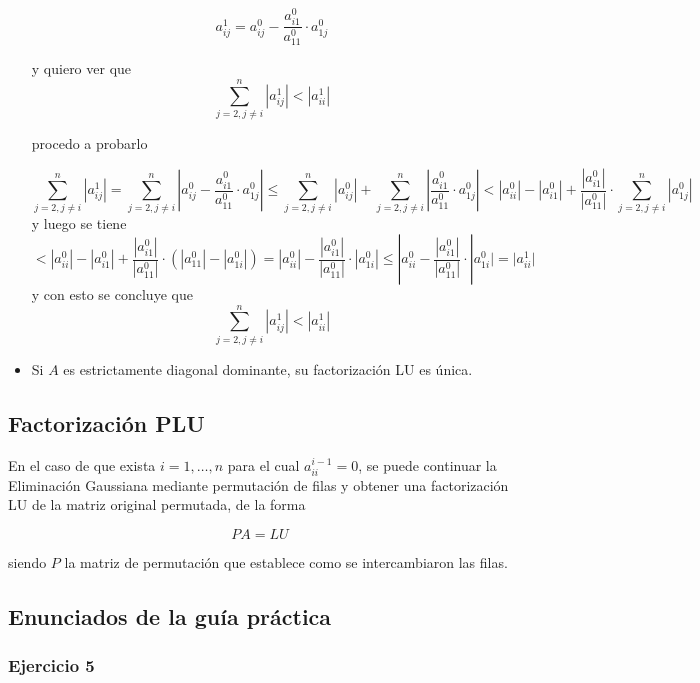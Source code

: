 \begin{itemize}
    \[a_{ij}^{1} = a_{ij}^{0} - \frac{a_{i1}^{0}}{a_{11}^{0}}\cdot a_{1j}^{0}\]
    
    y quiero ver que 
    \[\sum_{j = 2, j \neq i}^{n} |a_{ij}^{1}| < |a_{ii}^{1}|\]
    
    procedo a probarlo
    
    \[\sum_{j = 2, j \neq i}^{n} |a_{ij}^{1}| =  \sum_{j=2,j \neq i}^{n}|a_{ij}^{0} - \frac{a_{i1}^{0}}{a_{11}^{0}}\cdot a_{1j}^{0}| \leq \sum_{j=2,j \neq i}^{n}|a_{ij}^{0}| + \sum_{j=2,j \neq i}^{n} |\frac{a_{i1}^{0}}{a_{11}^{0}}\cdot a_{1j}^{0}| < |a_{ii}^{0}|-|a_{i1}^{0}| + \frac{|a_{i1}^{0}|}{|a_{11}^{0}|}\cdot\sum_{j=2, j \neq i}^{n}|a_{1j}^{0}|\]
    y luego se tiene 
    \[< |a_{ii}^{0}|-|a_{i1}^{0}| + \frac{|a_{i1}^{0}|}{|a_{11}^{0}|}\cdot (|a_{11}^{0}| - |a_{1i}^{0}|) = |a_{ii}^{0}| - \frac{|a_{i1}^{0}|}{|a_{11}^{0}|}\cdot |a_{1i}^{0}| \leq |a_{ii}^{0} - \frac{|a_{i1}^{0}|}{|a_{11}^{0}|}\cdot |a_{1i}^{0}| = |a_{ii}^{1}|\]
    y con esto se concluye que
    \[\sum_{j = 2, j \neq i}^{n} |a_{ij}^{1}| < |a_{ii}^{1}|\]
    \item Si $A$ es estrictamente diagonal dominante, su factorización LU es única.
\end{itemize}

\subsection{Factorización PLU}\label{subsec:factorizacion_plu}

En el caso de que exista $i = 1,\ldots,n$ para el cual $a_{ii}^{i-1} = 0$, se puede continuar la Eliminación Gaussiana mediante permutación de filas y obtener una factorización LU de la matriz original permutada, de la forma 

\[PA = LU\]

siendo $P$ la matriz de permutación que establece como se intercambiaron las filas.

\subsection{Enunciados de la guía práctica}\label{subsec:enunciados_guia_2}

\subsubsection{Ejercicio 5}\label{subsubsec:guia_2_ej_5}

